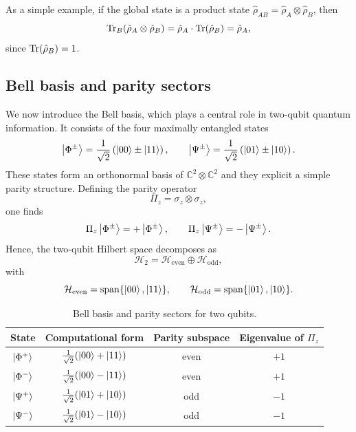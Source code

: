 As a simple example, if the global state is a product state $\hat \rho_{AB}=\hat \rho_A\otimes\hat \rho_B$, then
\begin{equation}
	\Tr_B(\hat \rho_A\otimes\hat \rho_B)
	=
	\hat \rho_A \cdot \Tr(\hat \rho_B)
	=
	\hat \rho_A,
	\label{eq:intro_qm_partial_trace_product_state}
\end{equation}
since $\Tr(\hat \rho_B)=1$.

\subsection{Bell basis and parity sectors}

We now introduce the Bell basis, which plays a central role in two-qubit quantum information. It consists of the four maximally entangled states
\begin{equation}
	\ket{\Phi^\pm}
	=
	\frac{1}{\sqrt{2}}\left(\ket{00}\pm\ket{11}\right),
	\qquad
	\ket{\Psi^\pm}
	=
	\frac{1}{\sqrt{2}}\left(\ket{01}\pm\ket{10}\right).
	\label{eq:intro_qm_bell_basis_definition}
\end{equation}
These states form an orthonormal basis of $\mathds{C}^2\otimes\mathds{C}^2$ and they explicit a simple parity structure. Defining the parity operator
\begin{equation}
	\Pi_z=\sigma_z\otimes\sigma_z,
	\label{eq:intro_qm_two_qubit_parity_operator}
\end{equation}
one finds
\begin{equation}
	\Pi_z\ket{\Phi^\pm}=+\ket{\Phi^\pm},
	\qquad
	\Pi_z\ket{\Psi^\pm}=-\ket{\Psi^\pm}.
	\label{eq:intro_qm_bell_basis_parity_eigenvalues}
\end{equation}
Hence, the two-qubit Hilbert space decomposes as
\begin{equation}
	\mathcal{H}_{2}
	=
	\mathcal{H}_{\mathrm{even}}\oplus \mathcal{H}_{\mathrm{odd}},
	\label{eq:intro_qm_two_qubit_parity_decomposition}
\end{equation}
with
\begin{equation}
	\mathcal{H}_{\mathrm{even}}=\operatorname{span}\{\ket{00},\ket{11}\},
	\qquad
	\mathcal{H}_{\mathrm{odd}}=\operatorname{span}\{\ket{01},\ket{10}\}.
	\label{eq:intro_qm_even_odd_subspaces}
\end{equation}

\begin{table}[h]
	\centering
	\begin{tabular}{c c c c}
		\hline
		State & Computational form & Parity subspace & Eigenvalue of $\Pi_z$ \\
		\hline
		$\ket{\Phi^+}$ & $\frac{1}{\sqrt{2}}(\ket{00}+\ket{11})$ & even & $+1$ \\
		$\ket{\Phi^-}$ & $\frac{1}{\sqrt{2}}(\ket{00}-\ket{11})$ & even & $+1$ \\
		$\ket{\Psi^+}$ & $\frac{1}{\sqrt{2}}(\ket{01}+\ket{10})$ & odd & $-1$ \\
		$\ket{\Psi^-}$ & $\frac{1}{\sqrt{2}}(\ket{01}-\ket{10})$ & odd & $-1$ \\
		\hline
	\end{tabular}
	\caption{Bell basis and parity sectors for two qubits.}
	\label{tab:intro_qm_bell_basis_parity}
\end{table}

